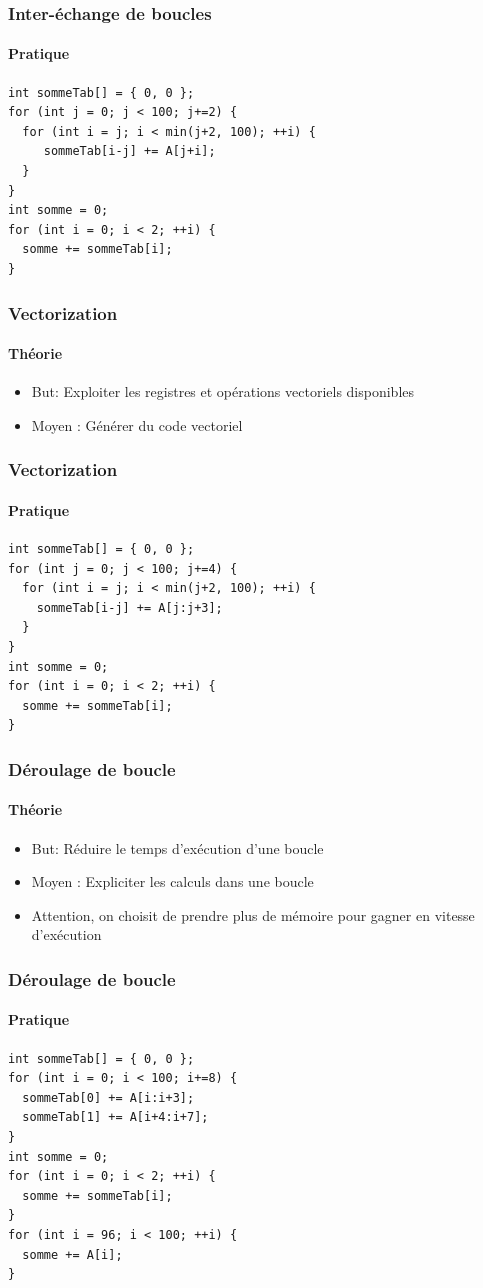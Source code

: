 \documentclass{beamer}
\begin{document}
\begin{frame}[fragile]
\frametitle{Inter-échange de boucles}
\framesubtitle{Pratique}
\begin{lstlisting}
int sommeTab[] = { 0, 0 };
for (int j = 0; j < 100; j+=2) {
  for (int i = j; i < min(j+2, 100); ++i) {
     sommeTab[i-j] += A[j+i];
  }
}
int somme = 0;
for (int i = 0; i < 2; ++i) {
  somme += sommeTab[i];
}
\end{lstlisting}
\end{frame}

\begin{frame}
\frametitle{Vectorization}
\framesubtitle{Théorie}
\begin{itemize}
\item But: Exploiter les registres et opérations vectoriels disponibles
\item Moyen : Générer du code vectoriel
\end{itemize}
\end{frame}

\begin{frame}[fragile]
\frametitle{Vectorization}
\framesubtitle{Pratique}
\begin{lstlisting}
int sommeTab[] = { 0, 0 };
for (int j = 0; j < 100; j+=4) {
  for (int i = j; i < min(j+2, 100); ++i) {
    sommeTab[i-j] += A[j:j+3];
  }
}
int somme = 0;
for (int i = 0; i < 2; ++i) {
  somme += sommeTab[i];
}
\end{lstlisting}
\end{frame}

\begin{frame}
\frametitle{Déroulage de boucle}
\framesubtitle{Théorie}
\begin{itemize}
\item But: Réduire le temps d'exécution d'une boucle
\item Moyen : Expliciter les calculs dans une boucle
\item Attention, on choisit de prendre plus de mémoire pour gagner en vitesse d'exécution
\end{itemize}
\end{frame}

\begin{frame}[fragile]
\frametitle{Déroulage de boucle}
\framesubtitle{Pratique}
\begin{lstlisting}
int sommeTab[] = { 0, 0 };
for (int i = 0; i < 100; i+=8) {
  sommeTab[0] += A[i:i+3]; 
  sommeTab[1] += A[i+4:i+7];
}
int somme = 0;
for (int i = 0; i < 2; ++i) {
  somme += sommeTab[i];
}
for (int i = 96; i < 100; ++i) {
  somme += A[i];
}
\end{lstlisting}
\end{frame}
\end{document}
